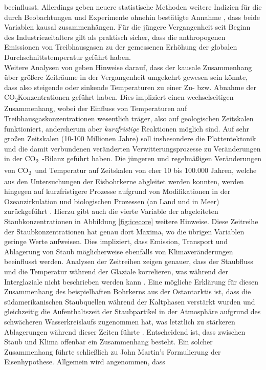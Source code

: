 \documentclass[12pt,a4paper,onecolumn,draft]{scrartcl}
\newcommand{\cotwo}{CO\textsubscript{2}}
\begin{document}
beeinflusst. Allerdings geben neuere statistische Methoden \citep{Stips.2016} weitere Indizien für die durch Beobachtungen und Experimente ohnehin bestätigte Annahme , dass beide Variablen kausal zusammenhängen. Für die jüngere Vergangenheit seit Beginn des Industriezeitalters gilt als praktisch sicher, dass die anthropogenen Emissionen von Treibhausgasen zu der gemessenen Erhöhung der globalen Durchschnittstemperatur geführt haben.  \\

Weitere Analysen von \citet{Stips.2016} geben Hinweise darauf, dass der kausale Zusammenhang über größere Zeiträume in der Vergangenheit umgekehrt gewesen sein könnte, dass also steigende oder sinkende Temperaturen zu einer Zu- bzw. Abnahme der \cotwo Konzentrationen geführt haben. Dies impliziert einen wechselseitigen Zusammenhang, wobei der Einfluss von Temperaturen auf Treibhausgaskonzentrationen wesentlich träger, also auf geologischen Zeitskalen funktioniert, andersherum aber \textit{kurzfristige} Reaktionen möglich sind.  Auf sehr großen Zeitskalen (10-100 Millionen Jahre) soll insbesondere die Plattentektonik und die damit verbundenen veränderten Verwitterungsprozesse zu Veränderungen in der \cotwo \ -Bilanz geführt haben. Die jüngeren und regelmäßigen Veränderungen von \cotwo \ und Temperatur auf Zeitskalen von eher 10 bis 100.000 Jahren, welche aus den Untersuchungen der Eisbohrkerne abgleitet werden konnten, werden hingegen auf kurzfristigere Prozesse aufgrund von Modifikationen in der Ozeanzirkulation und biologischen Prozessen (an Land und in Meer) zurückgeführt \citep{Emerson.2009}. Hierzu gibt auch die vierte Variable der abgeleiteten Staubkonzentrationen in Abbildung \ref{fig:icecore} weitere Hinweise. Diese Zeitreihe der Staubkonzentrationen hat genau dort Maxima, wo die übrigen Variablen geringe Werte aufweisen. Dies impliziert, dass Emission, Transport und Ablagerung von Staub möglicherweise ebenfalls von Klimaveränderungen beeinflusst werden. Analysen der Zeitreihen zeigen genauer, dass der Staubfluss und die Temperatur während der Glaziale korrelieren, was während der Interglaziale nicht beschrieben werden kann \citep{Lambert.2008}. Eine mögliche Erklärung für diesen Zusammenhang des beispielhaften Bohrkerns aus der Ostantarktis ist, dass die südamerikanischen Staubquellen während der Kaltphasen verstärkt wurden und gleichzeitig die Aufenthaltszeit der Staubpartikel in der Atmosphäre aufgrund des schwächeren Wasserkreislaufs zugenommen hat, was letztlich zu stärkeren Ablagerungen während dieser Zeiten führte \citep{Lambert.2008}. Entscheidend ist, dass zwischen Staub und Klima offenbar ein Zusammenhang besteht. Ein solcher Zusammenhang führte schließlich zu John Martin's Formulierung der Eisenhypothese. Allgemein wird angenommen, dass
\end{document}
